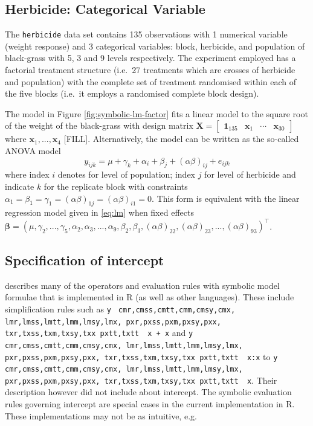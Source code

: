 \documentclass[runningheads]{llncs}
\makeatletter
\newcommand\midtilde@raisedtilde[1][.5]{\raisebox{#1ex}{\texttildelow}}
\def\midtilde@normaltilde{\texttildelow}
\newcommand\midtilde%
{%
  \expandafter\in@\expandafter{\f@family}%
    {cmr,cmss,cmtt,cmm,cmsy,cmx,%
    lmr,lmss,lmtt,lmm,lmsy,lmx,%
    pxr,pxss,pxm,pxsy,pxx,%
    txr,txss,txm,txsy,txx}%
  \ifin@%
    \midtilde@raisedtilde%
  \else%
    \expandafter\in@\expandafter{\f@family}%
    {pxtt,txtt}%
    \ifin@%
      \midtilde@raisedtilde[.35]%
    \else%
      \midtilde@normaltilde%
    \fi%
  \fi%
}
\makeatother
\begin{document}
\hypertarget{grass}{%
\subsection{Herbicide: Categorical Variable}\label{grass}}

The \texttt{herbicide} data set \autocite[original source from R. Hull, Rothamsted Research, data sourced from][]{Welham2015} contains 135 observations with 1 numerical variable (weight response) and 3 categorical variables: block, herbicide, and population of black-grass with 5, 3 and 9 levels respectively. The experiment employed has a factorial treatment structure (i.e.~27 treatments which are crosses of herbicide and population) with the complete set of treatment randomised within each of the five blocks (i.e.~it employs a randomised complete block design).

The model in Figure \ref{fig:symbolic-lm-factor} fits a linear model to the square root of the weight of the black-grass with design matrix \(\mathbf{X} = \begin{bmatrix}\boldsymbol{1}_{135} & \boldsymbol{x}_1 & \cdots & \boldsymbol{x}_{30}\end{bmatrix}\) where \(\boldsymbol{x}_1, ..., \boldsymbol{x}_4\) {[}FILL{]}. Alternatively, the model can be written as the so-called ANOVA model
\[y_{ijk} = \mu + \gamma_k + \alpha_i + \beta_j + (\alpha\beta)_{ij} + e_{ijk}\]
where index \(i\) denotes for level of population; index \(j\) for level of herbicide and indicate \(k\) for the replicate block with constraints \(\alpha_1 = \beta_1 = \gamma_1 = (\alpha\beta)_{1j}=(\alpha\beta)_{i1} = 0\). This form is equivalent with the linear regression model given in \eqref{eq:lm} when fixed effects \(\boldsymbol{\beta} = (\mu, \gamma_2,... , \gamma_5, \alpha_2, \alpha_3, ... , \alpha_9, \beta_2, \beta_3, (\alpha\beta)_{22}, (\alpha\beta)_{23}, ..., (\alpha\beta)_{93})^\top\).

\hypertarget{intercept}{%
\subsection{Specification of intercept}\label{intercept}}

\textcite{Wilkinson1973} describes many of the operators and evaluation rules with symbolic model formulae that is implemented in R (as well as other languages). These include simplification rules such as \texttt{y} \texttt{\midtilde\ }\texttt{x\ +\ x} and \texttt{y} \texttt{\midtilde\ }\texttt{x:x} to \texttt{y} \texttt{\midtilde\ }\texttt{x}. Their description however did not include about intercept. The symbolic evaluation rules governing intercept are special cases in the current implementation in R. These implementations may not be as intuitive, e.g.
\end{document}
